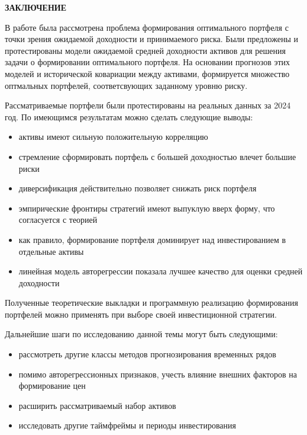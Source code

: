 \newpage
\begin{center}
	\textbf{\large ЗАКЛЮЧЕНИЕ}
\end{center}

В работе была рассмотрена проблема формирования оптимального портфеля с точки зрения ожидаемой доходности и принимаемого риска.
Были предложены и протестированы модели ожидаемой средней доходности активов для решения задачи о формировании оптимального портфеля.
На основании прогнозов этих моделей и исторической ковариации между активами, формируется множество оптмальных портфелей, 
соответсвующих заданному уровню риску. 

Рассматриваемые портфели были протестированы на реальных данных за 2024 год. По имеющимся результатам
можно сделать следующие выводы:
\begin{itemize}
	\item активы имеют сильную положительную корреляцию
	\item стремление  сформировать портфель с большей доходностью влечет большие риски
	\item диверсификация действительно позволяет снижать риск портфеля
	\item эмпирические фронтиры стратегий имеют выпуклую вверх форму, что согласуется с теорией
	\item как правило, формирование портфеля доминирует над инвестированием в отдельные активы
	\item линейная модель авторегрессии показала лучшее качество для оценки средней доходности
\end{itemize}

Полученные теоретические выкладки и программную реализацию формирования портфелей можно применять
при выборе своей инвестиционной стратегии. 

Дальнейшие шаги по исследованию данной темы могут быть следующими:
\begin{itemize}
	\item рассмотреть другие классы методов прогнозирования временных рядов
	\item помимо авторегрессионных признаков, учесть влияние внешних факторов на формирование цен
	\item расширить рассматриваемый набор активов
	\item исследовать другие таймфреймы и периоды инвестирования
\end{itemize}